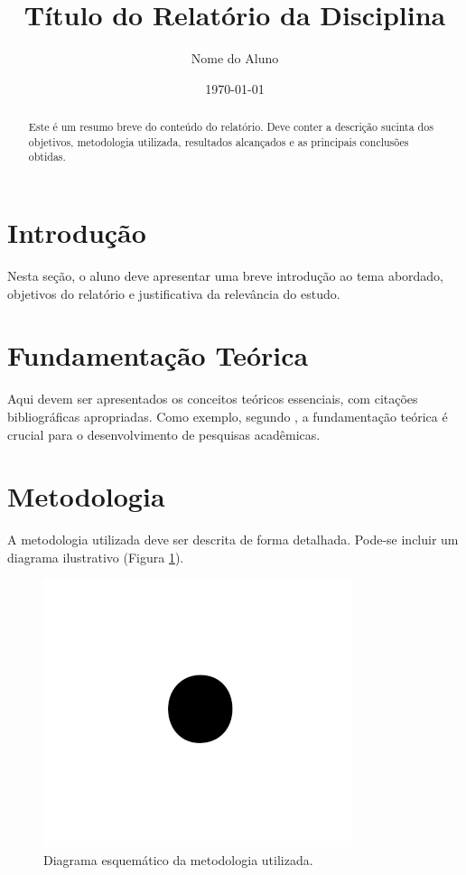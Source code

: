 \documentclass[conference]{IEEEtran}
\begin{document}
\title{Título do Relatório da Disciplina}
\author{Nome do Aluno}
\date{\today}

\maketitle

\begin{abstract}
Este é um resumo breve do conteúdo do relatório. Deve conter a descrição sucinta dos objetivos, metodologia utilizada, resultados alcançados e as principais conclusões obtidas.
\end{abstract}

\section{Introdução}

Nesta seção, o aluno deve apresentar uma breve introdução ao tema abordado, objetivos do relatório e justificativa da relevância do estudo.

\section{Fundamentação Teórica}

Aqui devem ser apresentados os conceitos teóricos essenciais, com citações bibliográficas apropriadas. Como exemplo, segundo \citet{bishop2006pattern}, a fundamentação teórica é crucial para o desenvolvimento de pesquisas acadêmicas.

\section{Metodologia}

A metodologia utilizada deve ser descrita de forma detalhada. Pode-se incluir um diagrama ilustrativo (Figura \ref{fig:metodo}).

\begin{figure}[H]
    \centering
    \includegraphics[width=\linewidth]{figuras/fig1.png}
    \caption{Diagrama esquemático da metodologia utilizada.}
    \label{fig:metodo}
\end{figure}
\end{document}
